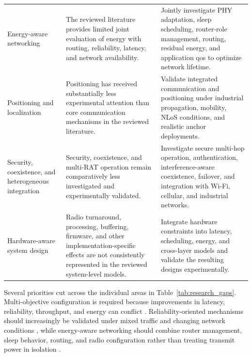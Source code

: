 \begin{table}[!t]
\begin{tabular}{p{3.0cm} p{5.3cm} p{7.0cm}}
Energy-aware networking &
The reviewed literature provides limited joint evaluation of energy with
routing, reliability, latency, and network availability. &
Jointly investigate PHY adaptation, sleep scheduling, router-role management,
routing, residual energy, and application \gls{qos} to optimize network
lifetime. \\

Positioning and localization &
Positioning has received substantially less experimental attention than core
communication mechanisms in the reviewed literature. &
Validate integrated communication and positioning under industrial
propagation, mobility, NLoS conditions, and realistic anchor deployments. \\

Security, coexistence, and heterogeneous integration &
Security, coexistence, and multi-RAT operation remain comparatively less
investigated and experimentally validated. &
Investigate secure multi-hop operation, authentication, interference-aware
coexistence, failover, and integration with Wi-Fi, cellular, and industrial
networks. \\

Hardware-aware system design &
Radio turnaround, processing, buffering, firmware, and other
implementation-specific effects are not consistently represented in the
reviewed system-level models. &
Integrate hardware constraints into latency, scheduling, energy, and
cross-layer models and validate the resulting designs experimentally. \\

\hline
\end{tabular}
\end{table}

Several priorities cut across the individual areas in
Table~\ref{tab:research_gaps}. Multi-objective configuration is required
because improvements in latency, reliability, throughput, and energy can
conflict
\cite{grafParetoOptimalityApproach2026a}. Reliability-oriented mechanisms
should increasingly be validated under mixed traffic and changing network
conditions
\cite{samuylovEmpoweringNearURLLCIoT2025,
glazkovImprovingNearURLLCServices2025,
ahmadMACLayerProtocolUltraReliable2025}, while energy-aware networking should
combine router management, sleep behavior, routing, and radio configuration
rather than treating transmit power in isolation
\cite{nihtilaEnergyConsumptionDECT20202022,
nihtilaEnergySavingRouter2022,
grafParetoOptimalityApproach2026a}.

